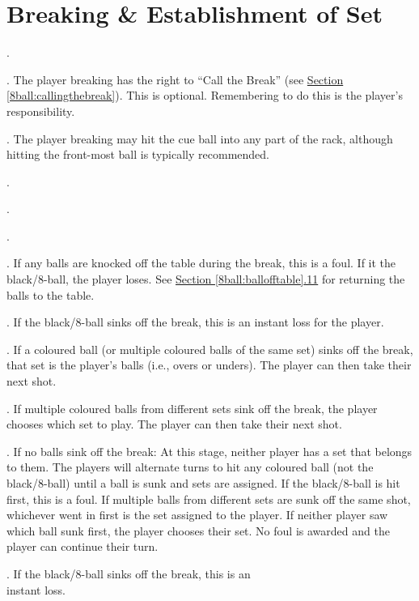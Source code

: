 \section{Breaking \& Establishment of Set} \label{8ball:breaking}
\ex. \CueBallPlacement\par
\ex. The player breaking has the right to “Call the Break” (see \hyperref[8ball:callingthebreak]{Section \ref*{8ball:callingthebreak}}). This is optional. Remembering to do this is the player's responsibility.\par
\ex. \label{8ball:breakingballs}The player breaking may hit the cue ball into any part of the rack, although hitting the front-most ball is typically recommended.\par
\ex. \CueBallMissOffBreak[8ball]\par
\ex. \CueBallRailOffBreak\par
\ex. \CueBallSinkOffBreak\par
\ex. If any balls are knocked off the table during the break, this is a foul. If it the black/8-ball, the player loses. See \hyperref[8ball:ballofftable]{Section \ref*{8ball:ballofftable}.11} for returning the balls to the table.\par
\ex. If the black/8-ball sinks off the break, this is an instant loss for the player.\par
\ex. If a coloured ball (or multiple coloured balls of the same set) sinks off the break, that set is the player's balls (i.e., overs or unders). The player can then take their next shot.\par
\ex. If multiple coloured balls from different sets sink off the break, the player chooses which set to play. The player can then take their next shot.\par
\ex. \label{8ball:breakingnoballs}If no balls sink off the break:\itemspace
{}At this stage, neither player has a set that belongs to them. The players will alternate turns to hit any coloured ball (not the black/8-ball) until a ball is sunk and sets are assigned.\itemspace
{}If the black/8-ball is hit first, this is a foul.\itemspace
{}If multiple balls from different sets are sunk off the same shot, whichever went in first is the set assigned to the player. If neither player saw which ball sunk first, the player chooses their set. No foul is awarded and the player can continue their turn.
\par
\ex. \hspace{-2.6mm} If the black/8-ball sinks off the break, this is an \\ \phantom{} \hspace{-2.5mm}instant loss.\par

